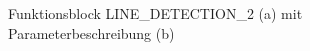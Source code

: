\documentclass[ngerman,12pt]{article} %
\begin{document}
{\begin{figure}[htbp]
  \centering
  \qquad
  \caption[Funktionsblock LINE\_DETECTION\_2 mit Parameterbeschreibung]{\label{pic:LINE_DETECTION_2}Funktionsblock LINE\_DETECTION\_2 (a) mit Parameterbeschreibung (b)}
\end{figure}

}
\end{document}
